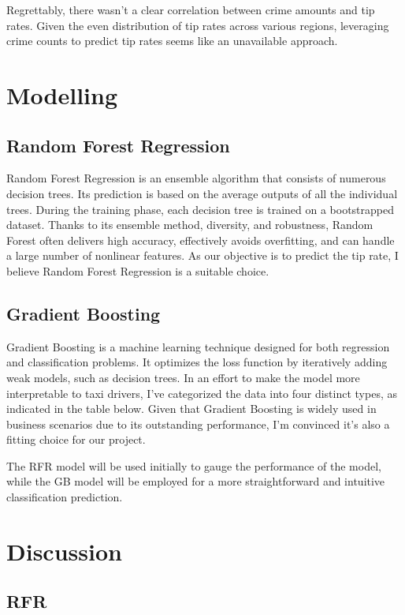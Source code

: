 \documentclass[11pt]{article}
\begin{document}
Regrettably, there wasn't a clear correlation between crime amounts and tip rates. Given the even distribution of tip rates across various regions, leveraging crime counts to predict tip rates seems like an unavailable approach.


\section{Modelling}
\subsection{Random Forest Regression} Random Forest Regression is an ensemble algorithm that consists of numerous decision trees. Its prediction is based on the average outputs of all the individual trees. During the training phase, each decision tree is trained on a bootstrapped dataset. Thanks to its ensemble method, diversity, and robustness, Random Forest often delivers high accuracy, effectively avoids overfitting, and can handle a large number of nonlinear features. As our objective is to predict the tip rate, I believe Random Forest Regression is a suitable choice.\cite{rfr}

\subsection{Gradient Boosting} Gradient Boosting is a machine learning technique designed for both regression and classification problems. It optimizes the loss function by iteratively adding weak models, such as decision trees. In an effort to make the model more interpretable to taxi drivers, I've categorized the data into four distinct types, as indicated in the table below. Given that Gradient Boosting is widely used in business scenarios due to its outstanding performance, I'm convinced it's also a fitting choice for our project.\cite{gb}

The RFR model will be used initially to gauge the performance of the model, while the GB model will be employed for a more straightforward and intuitive classification prediction.

\section{Discussion}
\subsection{RFR}
\end{document}
